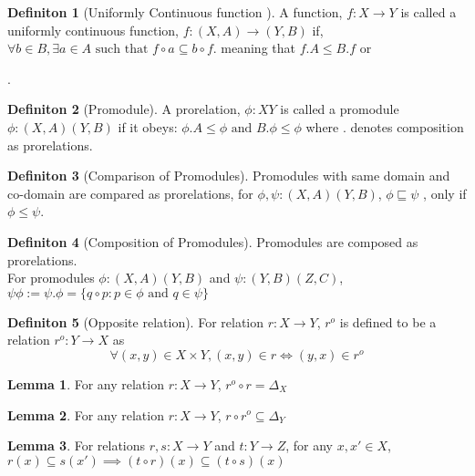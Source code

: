 \documentclass[18pt,a4paper]{article}
\makeatletter
\theoremstyle{definition}
\newtheorem{definition}{Definiton}[section]
\newtheorem{lemma}{Lemma}[definition]
\newcommand\cen[2][\leq]{\arrow[mysymbol]{#2}[description]{#1}}
\newcommand{\carrow}{}%
\DeclareRobustCommand{\carrow}{%
	\mathrel{\vphantom{\rightarrow}\mathpalette\circle@arrow\relax}%
}
\newcommand{\circle@arrow}[2]{%
	\m@th
	\ooalign{%
		\hidewidth$#1\circ\mkern1mu$\hidewidth\cr
	$#1\longrightarrow$\cr}%
}
\makeatother
\begin{document}
	\begin{definition}[Uniformly Continuous function ] %
		A function, $f:X \to Y$ is called a uniformly continuous function, $f:(X,A) \to (Y,B)$
		if, $\forall b \in B, \exists a \in A \text{ such that } f \circ a \subseteq b \circ f $.
		meaning that $f.A \leq B.f$ or
		.

	\end{definition}
	\begin{definition}[Promodule] %
		A prorelation, $\phi:X \carrow Y$ is called a promodule $\phi: (X,A) \carrow (Y,B)$  if it obeys:
		$ \phi.A \leq \phi \text{ and } B. \phi \leq \phi $ where . denotes composition as prorelations.
	\end{definition}
	\begin{definition}[Comparison of Promodules] %
		Promodules with same domain and co-domain are compared as prorelations, for
		$\phi,\psi:(X,A)\carrow (Y,B)$, $\phi \sqsubseteq \psi$ , only if $\phi \leq \psi$.
	\end{definition}
	\begin{definition}[Composition of Promodules] %
		Promodules are composed as prorelations.\\
		For promodules $\phi: (X,A) \carrow (Y,B)$ and $\psi:(Y,B)\carrow(Z,C)$,
		$\psi \phi := \psi.\phi = \{q \circ p :p\in \phi \text{ and } q \in \psi \}$
	\end{definition}
	\begin{definition}[Opposite relation] %
		For relation $r:X \to Y$, $r^o$ is defined to be a relation $r^o:Y \to X$ as
		\[ \forall (x,y)\in X \times Y, (x,y)\in r \iff (y,x) \in r^o \]
	\end{definition}
	\begin{lemma}
		For any relation $r:X \to Y$, $r^o \circ r = \Delta_X$
	\end{lemma}
	\begin{lemma}
		For any relation $r:X \to Y$, $r \circ r^o \subseteq \Delta_Y$
	\end{lemma}
	\begin{lemma} For relations $r,s:X\to Y$ and $t:Y\to Z$,
		for any $x,x' \in X$, $r(x)\subseteq s(x') \implies (t \circ r)(x) \subseteq
		(t \circ s)(x)$

	\end{lemma}
\end{document}
